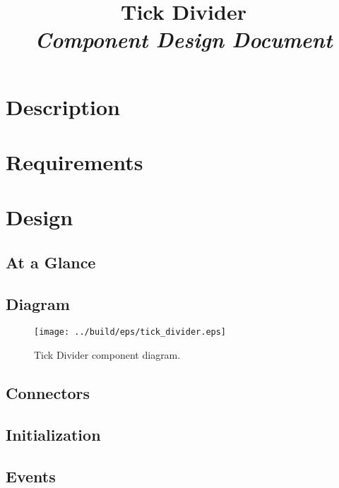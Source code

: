 



\title{\textbf{Tick Divider} \\
\large\textit{Component Design Document}}
\date{}
\maketitle

\section{Description}


\section{Requirements}


\section{Design}

\subsection{At a Glance}


\subsection{Diagram}
\begin{figure}[H]
  \texttt{[image: ../build/eps/tick\_divider.eps]}
  \caption{Tick Divider component diagram.}
\end{figure}

\subsection{Connectors}


\subsection{Initialization}


\subsection{Events}

